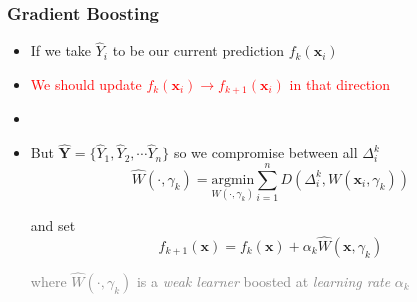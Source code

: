 \documentclass[xcolor={dvipsnames}]{beamer}
\begin{document}
\frame
{
 \frametitle{Gradient Boosting}

\begin{itemize}
\item  If we take $\hat Y_i$ to be our current prediction $f_k({\boldsymbol x}_i)$
\item<4->[$\Longrightarrow$] \textcolor{red}{We should update $f_k({\boldsymbol x}_i) \rightarrow f_{k+1}({\boldsymbol x}_i)$ in that direction}
\item[]
\item<5-> But $\hat {\boldsymbol Y} = \{\hat Y_1, \hat Y_2, \cdots \hat Y_n\}$ so we compromise between all $\Delta_i^k$ 
$$\hat W(\cdot, \gamma_k) = \underset{W(\cdot, \gamma_k)}{\text{argmin}} \sum_{i=1}^n D(\Delta_i^k, W({\boldsymbol x}_i, \gamma_k)) $$

and set 
$$f_{k+1}({\boldsymbol x}) = f_k({\boldsymbol x}) + \alpha_k \hat W({\boldsymbol x}, \gamma_k)$$ 

\textcolor{gray}{where $\hat W(\cdot, \gamma_k)$ is a \emph{weak learner} boosted at \emph{learning rate} $\alpha_k$} 

\end{itemize}

}
\end{document}
